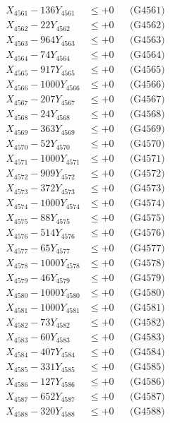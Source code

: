 \documentclass[a4paper,10pt]{article}
\begin{document}
{\begin{align}
\allowbreak
X_{4561} - 136Y_{4561} &\leq +0 && \text{(G4561)} \\
X_{4562} - 22Y_{4562} &\leq +0 && \text{(G4562)} \\
X_{4563} - 964Y_{4563} &\leq +0 && \text{(G4563)} \\
X_{4564} - 74Y_{4564} &\leq +0 && \text{(G4564)} \\
X_{4565} - 917Y_{4565} &\leq +0 && \text{(G4565)} \\
X_{4566} - 1000Y_{4566} &\leq +0 && \text{(G4566)} \\
X_{4567} - 207Y_{4567} &\leq +0 && \text{(G4567)} \\
X_{4568} - 24Y_{4568} &\leq +0 && \text{(G4568)} \\
X_{4569} - 363Y_{4569} &\leq +0 && \text{(G4569)} \\
X_{4570} - 52Y_{4570} &\leq +0 && \text{(G4570)} \\
\allowbreak
X_{4571} - 1000Y_{4571} &\leq +0 && \text{(G4571)} \\
X_{4572} - 909Y_{4572} &\leq +0 && \text{(G4572)} \\
X_{4573} - 372Y_{4573} &\leq +0 && \text{(G4573)} \\
X_{4574} - 1000Y_{4574} &\leq +0 && \text{(G4574)} \\
X_{4575} - 88Y_{4575} &\leq +0 && \text{(G4575)} \\
X_{4576} - 514Y_{4576} &\leq +0 && \text{(G4576)} \\
X_{4577} - 65Y_{4577} &\leq +0 && \text{(G4577)} \\
X_{4578} - 1000Y_{4578} &\leq +0 && \text{(G4578)} \\
X_{4579} - 46Y_{4579} &\leq +0 && \text{(G4579)} \\
X_{4580} - 1000Y_{4580} &\leq +0 && \text{(G4580)} \\
\allowbreak
X_{4581} - 1000Y_{4581} &\leq +0 && \text{(G4581)} \\
X_{4582} - 73Y_{4582} &\leq +0 && \text{(G4582)} \\
X_{4583} - 60Y_{4583} &\leq +0 && \text{(G4583)} \\
X_{4584} - 407Y_{4584} &\leq +0 && \text{(G4584)} \\
X_{4585} - 331Y_{4585} &\leq +0 && \text{(G4585)} \\
X_{4586} - 127Y_{4586} &\leq +0 && \text{(G4586)} \\
X_{4587} - 652Y_{4587} &\leq +0 && \text{(G4587)} \\
X_{4588} - 320Y_{4588} &\leq +0 && \text{(G4588)} \\

\end{align}}
\end{document}
